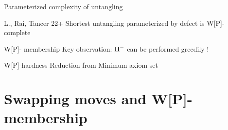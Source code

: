 \documentclass[11pt,xcolor=dvipsnames,presentation]{beamer}
\newcommand{\IImin}{\ensuremath{\rm{II}^-}\xspace}
\begin{document}
\begin{frame}{Parameterized complexity of untangling}
  \begin{block}{L., Rai, Tancer 22+}
    Shortest untangling parameterized by defect is W[P]-complete
  \end{block}

  \begin{block}{W[P]- membership}
    Key observation: \IImin can be performed greedily !
  \end{block}
  
  \begin{block}{W[P]-hardness}
    Reduction from Minimum axiom set
  \end{block}
\end{frame}

\section*{Swapping moves and W[P]-membership}
\end{document}
